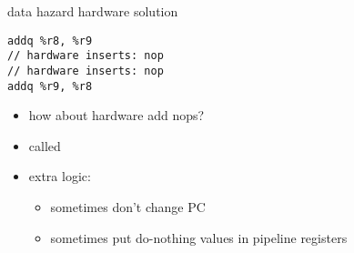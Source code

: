 \begin{frame}[fragile,label=dataHazardStall]{data hazard hardware solution}
\begin{lstlisting}[style=small]
addq %r8, %r9
// hardware inserts: nop
// hardware inserts: nop
addq %r9, %r8
\end{lstlisting}
\begin{itemize}
    \item how about hardware add nops?
    \item called 
    \item extra logic:
        \begin{itemize}
        \item sometimes don't change PC
        \item sometimes put do-nothing values in pipeline registers
        \end{itemize}
\end{itemize}
\end{frame}
